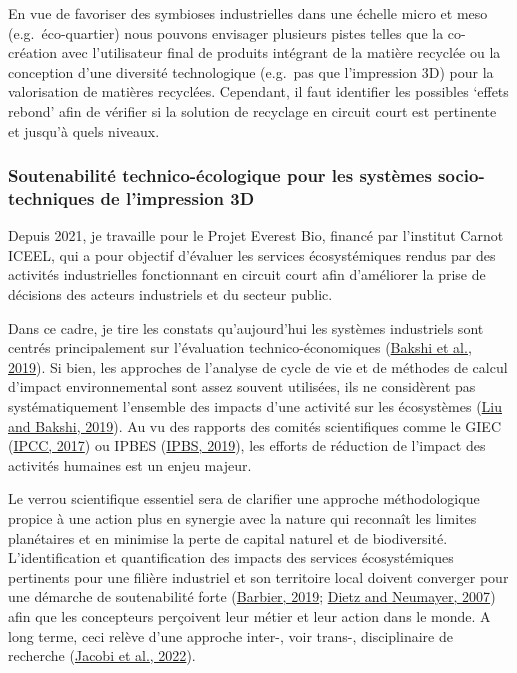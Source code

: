 \documentclass[
  11pt,
]{article}
\begin{document}
En vue de favoriser des symbioses industrielles dans une échelle micro
et meso (e.g.~éco-quartier) nous pouvons envisager plusieurs pistes
telles que la co-création avec l'utilisateur final de produits intégrant
de la matière recyclée ou la conception d'une diversité technologique
(e.g.~pas que l'impression 3D) pour la valorisation de matières
recyclées. Cependant, il faut identifier les possibles `effets rebond'
afin de vérifier si la solution de recyclage en circuit court est
pertinente et jusqu'à quels niveaux.

\hypertarget{soutenabilituxe9-technico-uxe9cologique-pour-les-systuxe8mes-socio-techniques-de-limpression-3d}{%
\subsubsection{Soutenabilité technico-écologique pour les systèmes
socio-techniques de l'impression
3D}\label{soutenabilituxe9-technico-uxe9cologique-pour-les-systuxe8mes-socio-techniques-de-limpression-3d}}

Depuis 2021, je travaille pour le Projet Everest Bio, financé par
l'institut Carnot ICEEL, qui a pour objectif d'évaluer les services
écosystémiques rendus par des activités industrielles fonctionnant en
circuit court afin d'améliorer la prise de décisions des acteurs
industriels et du secteur public.

Dans ce cadre, je tire les constats qu'aujourd'hui les systèmes
industriels sont centrés principalement sur l'évaluation
technico-économiques (\protect\hyperlink{ref-Bakshi2019b}{Bakshi et al.,
2019}). Si bien, les approches de l'analyse de cycle de vie et de
méthodes de calcul d'impact environnemental sont assez souvent
utilisées, ils ne considèrent pas systématiquement l'ensemble des
impacts d'une activité sur les écosystèmes
(\protect\hyperlink{ref-Liu2019g}{Liu and Bakshi, 2019}). Au vu des
rapports des comités scientifiques comme le GIEC
(\protect\hyperlink{ref-IPCC2017}{IPCC, 2017}) ou IPBES
(\protect\hyperlink{ref-IPBS2019}{IPBS, 2019}), les efforts de réduction
de l'impact des activités humaines est un enjeu majeur.

Le verrou scientifique essentiel sera de clarifier une approche
méthodologique propice à une action plus en synergie avec la nature qui
reconnaît les limites planétaires et en minimise la perte de capital
naturel et de biodiversité. L'identification et quantification des
impacts des services écosystémiques pertinents pour une filière
industriel et son territoire local doivent converger pour une démarche
de soutenabilité forte (\protect\hyperlink{ref-Barbier2019}{Barbier,
2019}; \protect\hyperlink{ref-Dietz2006}{Dietz and Neumayer, 2007}) afin
que les concepteurs perçoivent leur métier et leur action dans le monde.
A long terme, ceci relève d'une approche inter-, voir trans-,
disciplinaire de recherche (\protect\hyperlink{ref-Jacobi2022}{Jacobi et
al., 2022}).
\end{document}
